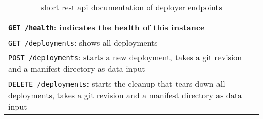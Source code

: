 \documentclass[../main.tex]{subfiles}
\begin{document}
    \begin{table}[h]
        \centering
        \begin{tabular}{p{10cm}}
            \midrule
            \verb|GET /health|: indicates the health of this instance \\ \midrule
            \verb|GET /deployments|: shows all deployments \\ \midrule
            \verb|POST /deployments|: starts a new deployment, takes a \gls{git} revision and a manifest directory as data input \\ \midrule
            \verb|DELETE /deployments|: starts the cleanup that tears down all deployments, takes a \gls{git} revision and a manifest directory as data input \\ \midrule
        \end{tabular}
        \captionsetup{justification=centering}
        \caption{
            short \acrshort{rest} \acrshort{api} documentation of \gls{deployer} endpoints
        }
        \label{tab:deployer_api}
    \end{table}
\end{document}
